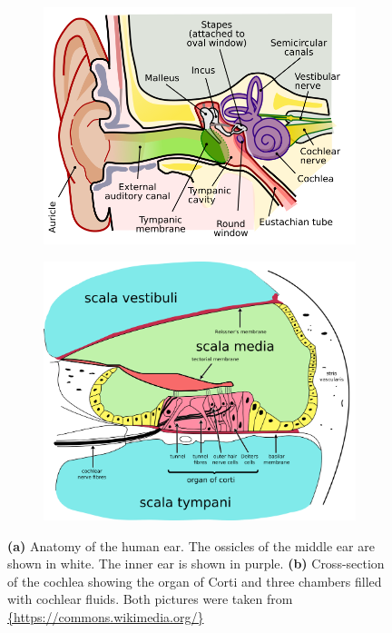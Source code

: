 \begin{figure}[h]
	\centering
	\begin{subfigure}{0.5\textwidth}
		\centering
		\includegraphics[width=\linewidth]{include/anatomy_of_the_human_ear}\caption{}\label{img:anatomy_human_ear}
	\end{subfigure}%
	\begin{subfigure}{0.5\textwidth}
		\centering
		\includegraphics[width=\linewidth]{include/cochlea_cross_section}\caption{}\label{img:cochlea_cross_section}
	\end{subfigure}
	\caption{\textbf{(a)} Anatomy of the human ear. The ossicles of the middle ear are shown in white. The inner ear is shown in purple. \textbf{(b)} Cross-section of the cochlea showing the organ of Corti and three chambers filled with cochlear fluids. Both pictures were taken from \url{{https://commons.wikimedia.org/}}}
	\label{img:biology_1}
\end{figure}

